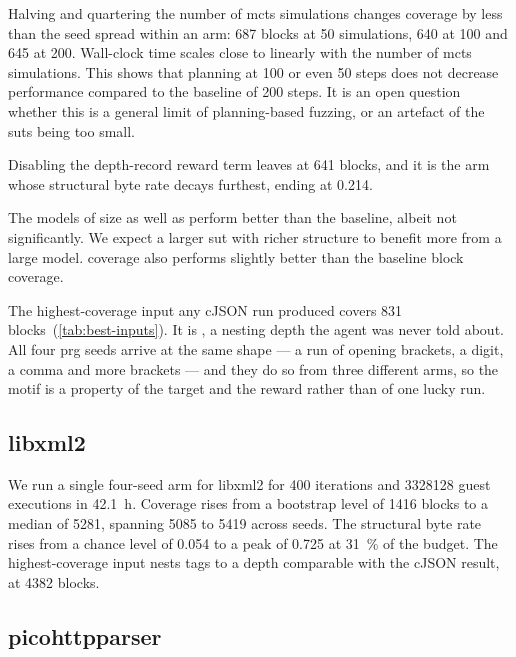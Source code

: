 Halving and quartering the number of \gls{mcts} simulations changes coverage by less than the
seed spread within an arm: \num{687} blocks at 50 simulations, \num{640} at 100 and \num{645}
at 200.
Wall-clock time scales close to linearly with the number of \gls{mcts} simulations.
This shows that planning at 100 or even 50 steps does not decrease performance
compared to the baseline of 200 steps.
It is an open question whether this is a general limit of planning-based fuzzing,
or an artefact of the \glspl{sut} being too small.

Disabling the depth-record reward term leaves  at \num{641} blocks, and it is the arm
whose structural byte rate decays furthest, ending at \num{0.214}.

The models of size  as well as  perform better than the baseline, albeit
not significantly.
We expect a larger \gls{sut} with richer structure to benefit more from a large model.
 coverage also performs slightly better than the baseline block coverage.

The highest-coverage input any cJSON run produced covers \num{831}
blocks~(\cref{tab:best-inputs}).
It is \code{[[[[[2,[[[[[1\ldots}, a nesting depth the agent was never told about.
All four \gls{prg} seeds arrive at the same shape --- a run of opening brackets, a digit, a comma and
more brackets --- and they do so from three different arms, so the motif is a property of the
target and the reward rather than of one lucky run.

\subsection{libxml2}\label{sec:results-libxml2}

We run a single four-seed arm for libxml2 for 400 iterations and \num{3328128} guest executions in \SI{42.1}{\hour}.
Coverage rises from a bootstrap level of \num{1416} blocks to a median of \num{5281}, spanning
\num{5085} to \num{5419} across seeds.
The structural byte rate rises from a chance level of \num{0.054} to a peak of \num{0.725} at
\SI{31}{\percent} of the budget.
The highest-coverage input nests tags to a depth comparable with the cJSON result, at \num{4382}
blocks.

\subsection{picohttpparser}\label{sec:results-picohttpparser}

